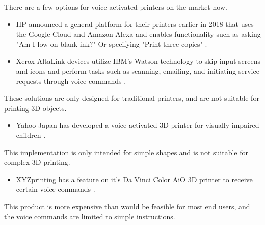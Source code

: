 There are a few options for voice-activated printers on the market now.
\begin{itemize}
  \item HP announced a general platform for their printers earlier in 2018 that uses the Google Cloud and Amazon Alexa and enables functionality such as asking "Am I low on blank ink?" Or specifying "Print three copies" \cite{HP2018}.
  \item Xerox AltaLink devices utilize IBM's Watson technology to skip input screens and icons and perform tasks such as scanning, emailing, and initiating service requests through voice commands \cite{Xerox2018}.
\end{itemize}
These solutions are only designed for traditional printers, and are not suitable for printing 3D objects.
\begin{itemize}
  \item Yahoo Japan has developed a voice-activated 3D printer for visually-impaired children \cite{Yahoo2013}.
\end{itemize}
This implementation is only intended for simple shapes and is not suitable for complex 3D printing.
\begin{itemize}
  \item XYZprinting has a feature on it's Da Vinci Color AiO 3D printer to receive certain voice commands \cite{XYZ2018}.
\end{itemize}
This product is more expensive than would be feasible for most end users, and the voice commands are limited to simple instructions.